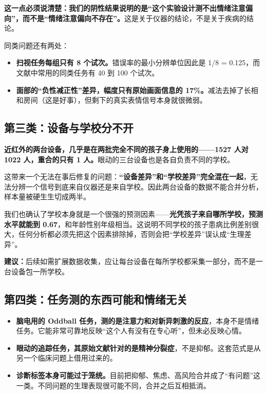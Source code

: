 \documentclass[UTF8,12pt,a4paper]{ctexart}
\newcommand{\key}[1]{\textbf{\textcolor{blue!45!black}{#1}}}
\begin{document}
\key{这一点必须说清楚：我们的阴性结果说明的是“这个实验设计测不出情绪注意偏向”，而不是“情绪注意偏向不存在”。}这是关于仪器的结论，不是关于疾病的结论。

同类问题还有两处：

\begin{itemize}
\item \key{扫视任务每组只有 8 个试次。}错误率的最小分辨单位因此是 1/8 = 0.125，而文献中常用的同类任务有 40 到 100 个试次。
\item \key{面部的“负性减正性”差异，幅度只有原始画面信息的 17\%。}减法去掉了长相和房间（这是好事），但剩下的真实表情信号本身就很微弱。
\end{itemize}

\subsection{第三类：设备与学校分不开}

\key{近红外的两台设备，几乎是在两批完全不同的孩子身上使用的——1527 人对 1022 人，重合的只有 1 人。}眼动的三台设备也是各自负责不同的学校。

这带来一个无法在事后修复的问题：\key{“设备差异”和“学校差异”完全混在一起}，无法分辨一个信号到底来自仪器还是来自学校。因此两台设备的数据不能合并分析，样本量被硬生生切成两半。

我们也确认了学校本身就是一个很强的预测因素——\key{光凭孩子来自哪所学校，预测水平就能到 0.67}，和年龄性别年级相当。这说明不同学校的孩子患病比例差别很大，任何分析都必须先把这个因素排除掉，否则会把“学校差异”误认成“生理差异”。

\key{建议：}后续如需扩展数据收集，应让每台设备在每所学校都采集一部分，而不是一台设备包一所学校。

\subsection{第四类：任务测的东西可能和情绪无关}

\begin{itemize}
\item \key{脑电用的 Oddball 任务，测的是注意力和对新异刺激的反应}，本身不是情绪任务。它能非常可靠地反映“这个人有没有在专心听”，但未必反映心情。
\item \key{眼动的追踪任务，其原始文献针对的是精神分裂症}，不是抑郁。这套范式是从另一个临床问题上借用过来的。
\item \key{诊断标签本身可能过于笼统。}目前把抑郁、焦虑、高风险合并成了“有问题”这一类。不同问题的生理表现很可能不同，合并之后互相抵消。
\end{itemize}
\end{document}

